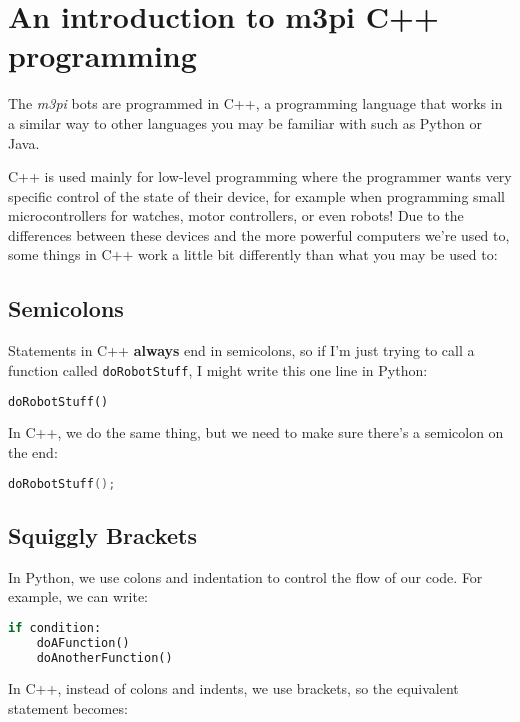 \section{An introduction to m3pi C++
programming}\label{an-introduction-to-m3pi-c-programming}

The \emph{m3pi} bots are programmed in C++, a programming language that
works in a similar way to other languages you may be familiar with such
as Python or Java.

C++ is used mainly for low-level programming where the programmer wants
very specific control of the state of their device, for example when
programming small microcontrollers for watches, motor controllers, or
even robots! Due to the differences between these devices and the more
powerful computers we're used to, some things in C++ work a little bit
differently than what you may be used to:

\subsection{Semicolons}\label{semicolons}

Statements in C++ \textbf{always} end in semicolons, so if I'm just
trying to call a function called \lstinline!doRobotStuff!, I might write
this one line in Python:

\begin{lstlisting}[language=Python]
doRobotStuff()
\end{lstlisting}

In C++, we do the same thing, but we need to make sure there's a
semicolon on the end:

\begin{lstlisting}[language={C++}]
doRobotStuff();
\end{lstlisting}

\subsection{Squiggly Brackets}\label{squiggly-brackets}

In Python, we use colons and indentation to control the flow of our
code. For example, we can write:

\begin{lstlisting}[language=Python]
if condition:
    doAFunction()
    doAnotherFunction()
\end{lstlisting}

In C++, instead of colons and indents, we use brackets, so the
equivalent statement becomes:

